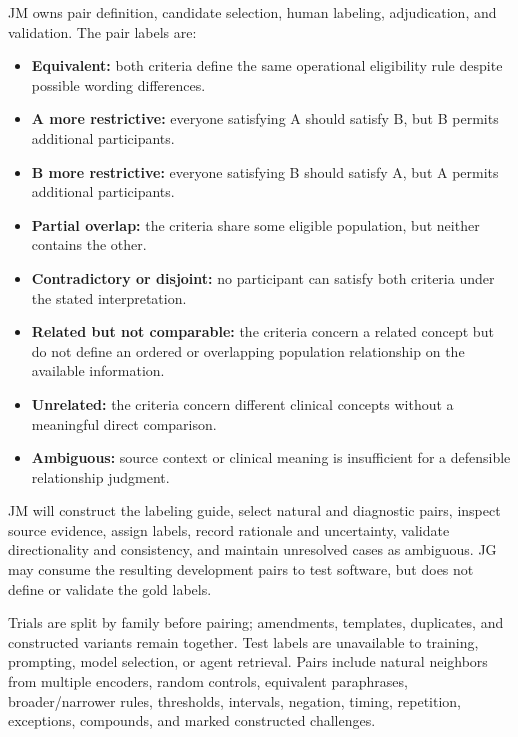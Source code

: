 \documentclass[10pt]{article}
\begin{document}
JM owns pair definition, candidate selection, human labeling, adjudication, and validation. The pair labels are:
\begin{itemize}
\item \textbf{Equivalent:} both criteria define the same operational eligibility rule despite possible wording differences.
\item \textbf{A more restrictive:} everyone satisfying A should satisfy B, but B permits additional participants.
\item \textbf{B more restrictive:} everyone satisfying B should satisfy A, but A permits additional participants.
\item \textbf{Partial overlap:} the criteria share some eligible population, but neither contains the other.
\item \textbf{Contradictory or disjoint:} no participant can satisfy both criteria under the stated interpretation.
\item \textbf{Related but not comparable:} the criteria concern a related concept but do not define an ordered or overlapping population relationship on the available information.
\item \textbf{Unrelated:} the criteria concern different clinical concepts without a meaningful direct comparison.
\item \textbf{Ambiguous:} source context or clinical meaning is insufficient for a defensible relationship judgment.
\end{itemize}

JM will construct the labeling guide, select natural and diagnostic pairs, inspect source evidence, assign labels, record rationale and uncertainty, validate directionality and consistency, and maintain unresolved cases as ambiguous. JG may consume the resulting development pairs to test software, but does not define or validate the gold labels.

Trials are split by family before pairing; amendments, templates, duplicates, and constructed variants remain together. Test labels are unavailable to training, prompting, model selection, or agent retrieval. Pairs include natural neighbors from multiple encoders, random controls, equivalent paraphrases, broader/narrower rules, thresholds, intervals, negation, timing, repetition, exceptions, compounds, and marked constructed challenges.
\end{document}
